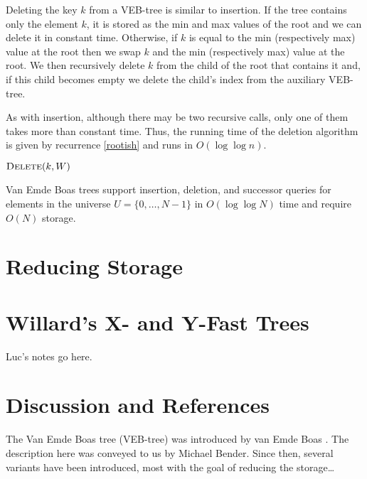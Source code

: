 Deleting the key $k$ from a VEB-tree is similar to insertion.  If the
tree contains only the element $k$, it is stored as the min and max
values of the root and we can delete it in constant time.  Otherwise,
if $k$ is equal to the min (respectively max) value at the root then
we swap $k$ and the min (respectively max) value at the root.  We then
recursively delete $k$ from the child of the root that contains it
and, if this child becomes empty we delete the child's index from the
auxiliary VEB-tree.

As with insertion, although there may be two recursive calls, only one
of them takes more than constant time.  Thus, the running time of the
deletion algorithm is given by recurrence \eqref{rootish} and runs
in $O(\log\log n)$.

\noindent$\textsc{Delete}(k,W)$
\begin{algorithmic}[1]
  \ELSE
  \ENDIF
{}
\ENDIF
{}
\ENDIF
\end{algorithmic}


\begin{thm}
Van Emde Boas trees support insertion, deletion, and successor queries
for elements in the universe $U=\{0,\ldots,N-1\}$ in $O(\log\log N)$
time and require $O(N)$ storage.
\end{thm}

\section{Reducing Storage}

\section{Willard's X- and Y-Fast Trees}

Luc's notes go here.


\section{Discussion and References}

The Van Emde Boas tree (VEB-tree) was introduced by van Emde Boas
\cite{veb74,vkz77}.  The description here was conveyed to us by
Michael Bender.  Since then, several variants have been introduced,
most with the goal of reducing the storage\ldots


